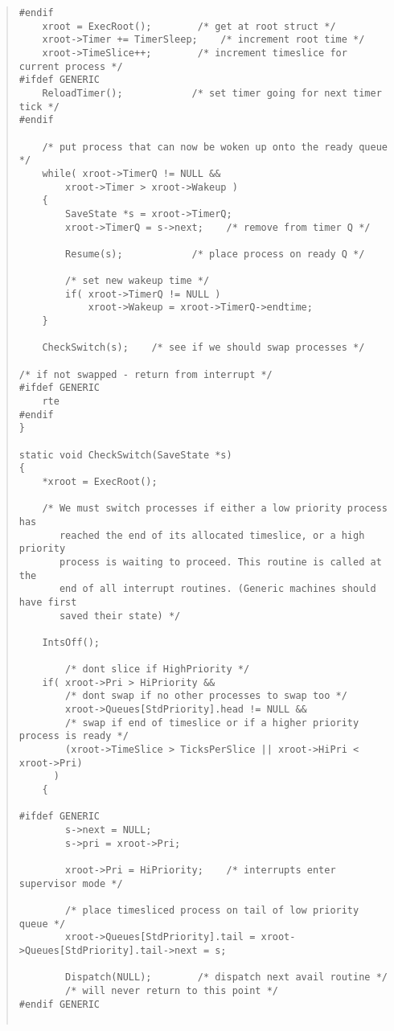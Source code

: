 \begin {quote}
\begin{verbatim}
#endif
    xroot = ExecRoot();        /* get at root struct */
    xroot->Timer += TimerSleep;    /* increment root time */
    xroot->TimeSlice++;        /* increment timeslice for current process */
#ifdef GENERIC
    ReloadTimer();            /* set timer going for next timer tick */
#endif

    /* put process that can now be woken up onto the ready queue */
    while( xroot->TimerQ != NULL &&
        xroot->Timer > xroot->Wakeup )
    {
        SaveState *s = xroot->TimerQ;
        xroot->TimerQ = s->next;    /* remove from timer Q */

        Resume(s);            /* place process on ready Q */

        /* set new wakeup time */
        if( xroot->TimerQ != NULL ) 
            xroot->Wakeup = xroot->TimerQ->endtime;
    }

    CheckSwitch(s);    /* see if we should swap processes */

/* if not swapped - return from interrupt */
#ifdef GENERIC
    rte
#endif
}

static void CheckSwitch(SaveState *s)
{
    *xroot = ExecRoot();

    /* We must switch processes if either a low priority process has
       reached the end of its allocated timeslice, or a high priority
       process is waiting to proceed. This routine is called at the
       end of all interrupt routines. (Generic machines should have first
       saved their state) */

    IntsOff();

        /* dont slice if HighPriority */
    if( xroot->Pri > HiPriority &&
        /* dont swap if no other processes to swap too */
        xroot->Queues[StdPriority].head != NULL &&
        /* swap if end of timeslice or if a higher priority process is ready */
        (xroot->TimeSlice > TicksPerSlice || xroot->HiPri < xroot->Pri)
      )
    {

#ifdef GENERIC
        s->next = NULL;
        s->pri = xroot->Pri;

        xroot->Pri = HiPriority;    /* interrupts enter supervisor mode */

        /* place timesliced process on tail of low priority queue */
        xroot->Queues[StdPriority].tail = xroot->Queues[StdPriority].tail->next = s;

        Dispatch(NULL);        /* dispatch next avail routine */
        /* will never return to this point */
#endif GENERIC


\end{verbatim}
\end{quote}
